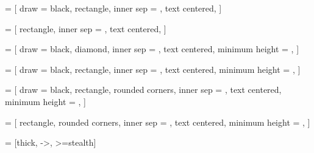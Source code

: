  = [
    draw = black,
    rectangle,
    inner sep = \innersep,
    text centered,
]

 = [
    rectangle,
    inner sep = \innersep,
    text centered,
]


 = [
    draw = black,
    diamond,
    inner sep = \innersep,
    text centered,
    minimum height = \nodesep,
]

 = [
    draw = black,
    rectangle,
    inner sep = \innersep,
    text centered,
    minimum height = \nodesep,
]

 = [
    draw = black,
    rectangle, rounded corners,
    inner sep = \innersep,
    text centered,
    minimum height = \nodesep,
]

 = [
    rectangle, rounded corners,
    inner sep = \innersep,
    text centered,
    minimum height = \nodesep,
]

 = [thick, ->, >=stealth]